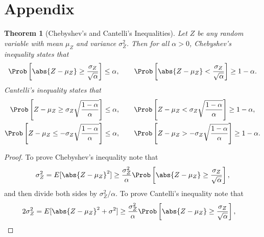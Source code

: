 \documentclass[12pt]{amsart}
\newtheorem{theorem}{Theorem}
\begin{document}
\section*{Appendix}
\begin{theorem}[Chebyshev's and Cantelli's Inequalities] \label{Chebineqthm} Let $Z$ be any random variable with mean $\mu_Z$ and variance $\sigma^2_{Z}$.  Then for all $\alpha >0$, Chebyshev's inequality states that
\[
\Prob\left[\abs{Z-\mu_Z} \ge \frac{\sigma_Z}{\sqrt{\alpha}} \right] \le \alpha, \qquad \Prob\left[\abs{Z-\mu_Z} < \frac{\sigma_Z}{\sqrt{\alpha}} \right] \ge 1-\alpha.
\]
Cantelli's inequality states that
\begin{gather*}
\Prob\left[Z-\mu_Z \ge \sigma_Z \sqrt{\frac{1-\alpha}{\alpha}} \right] \le \alpha, \qquad \Prob\left[Z-\mu_Z < \sigma_Z \sqrt{\frac{1-\alpha}{\alpha}} \right] \ge 1-\alpha, \\
\Prob\left[Z-\mu_Z \le - \sigma_Z \sqrt{\frac{1-\alpha}{\alpha}} \right] \le \alpha, \qquad \Prob\left[Z-\mu_Z > -\sigma_Z \sqrt{\frac{1-\alpha}{\alpha}} \right] \ge 1-\alpha.
\end{gather*}
\end{theorem}
\begin{proof}To prove Chebyshev's inequality note that
\begin{equation*}
\sigma^2_{Z} = E[\abs{Z-\mu_Z}^2] \ge \frac{\sigma^2_Z}{\alpha} \Prob\left[\abs{Z-\mu_Z} \ge \frac{\sigma_Z}{\sqrt{\alpha}} \right],
\end{equation*}
and then divide both sides by $\sigma^2_Z/\alpha$. To prove Cantelli's inequality note that
\begin{align*}
2\sigma^2_{Z} &= E[\abs{Z-\mu_Z}^2 + \sigma^2] \ge \frac{\sigma^2_Z}{\alpha} \Prob\left[\abs{Z-\mu_Z} \ge \frac{\sigma_Z}{\sqrt{\alpha}} \right],
\end{align*}
\end{proof}
\end{document}
